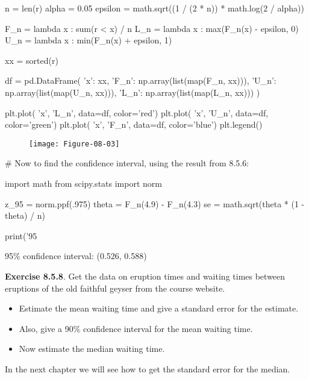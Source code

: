 \begin{python}
n = len(r)
alpha = 0.05
epsilon = math.sqrt((1 / (2 * n)) * math.log(2 / alpha))

F_{n} = lambda x : sum(r < x) / n
L_{n} = lambda x : max(F_{n}(x) - epsilon, 0)
U_{n} = lambda x : min(F_{n}(x) + epsilon, 1)

xx = sorted(r)

df = pd.DataFrame({
    'x': xx, 
    'F_{n}': np.array(list(map(F_{n}, xx))), 
    'U_{n}': np.array(list(map(U_{n}, xx))), 
    'L_{n}': np.array(list(map(L_{n}, xx)))
})

plt.plot( 'x', 'L_{n}', data=df, color='red')
plt.plot( 'x', 'U_{n}', data=df, color='green')
plt.plot( 'x', 'F_{n}', data=df, color='blue')
plt.legend()
\end{python}

\begin{figure}[H]
\centering
\texttt{[image: Figure-08-03]}
\end{figure}

\begin{python}
# Now to find the confidence interval, using the result from 8.5.6:

import math
from scipy.stats import norm

z_95 = norm.ppf(.975)
theta = F_{n}(4.9) - F_{n}(4.3)
se = math.sqrt(theta * (1 - theta) / n)

print('95%
\end{python}

\begin{console}
95\% confidence interval: (0.526, 0.588)
\end{console}

\textbf{Exercise 8.5.8}. Get the data on eruption times and waiting
times between eruptions of the old faithful geyser from the course
website.

\begin{itemize}[tightlist]
\item
  Estimate the mean waiting time and give a standard error for the
  estimate.
\item
  Also, give a 90\% confidence interval for the mean waiting time.
\item
  Now estimate the median waiting time.
\end{itemize}

In the next chapter we will see how to get the standard error for the
median.

